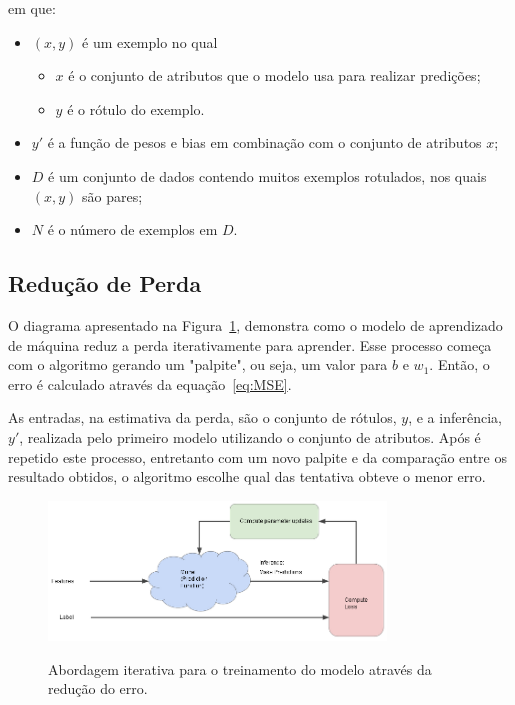             
            em que:
            \begin{itemize}
                \item $(x,y)$ é um exemplo no qual
                \begin{itemize}
                    \item $x$ é o conjunto de atributos que o modelo usa para realizar predições;
                    \item $y$ é o rótulo do exemplo.
                \end{itemize}
                \item $y'$ é a função de pesos e bias em combinação com o conjunto de atributos $x$;
                \item $D$ é um conjunto de dados contendo muitos exemplos rotulados, nos quais $(x,y)$ são pares;
                \item $N$ é o número de exemplos em $D$.
            \end{itemize}
            
       \subsection{Redução de Perda}     
    
            O diagrama apresentado na Figura~\ref{fig:abordagem_iterativa}, demonstra como o modelo de aprendizado de máquina reduz a perda iterativamente para aprender. Esse processo começa com o algoritmo gerando um "palpite", ou seja, um valor para $b$ e $w_1$. Então, o erro é calculado através da equação~\ref{eq:MSE}. 
            
            As entradas, na estimativa da perda, são o conjunto de rótulos, $y$, e a inferência, $y'$, realizada pelo primeiro modelo utilizando o conjunto de atributos. Após é repetido este processo, entretanto com um novo palpite e da comparação entre os resultado obtidos, o algoritmo escolhe qual das tentativa obteve o menor erro.
    
            \begin{figure}[H]
                \centering
                \caption{Abordagem iterativa para o treinamento do modelo através da redução do erro.}
                \includegraphics[width=0.8\textwidth]{fig/2-fundamentacao/aprendizado/abordagem_iterativa.png}
                \label{fig:abordagem_iterativa}
            \end{figure}
            
